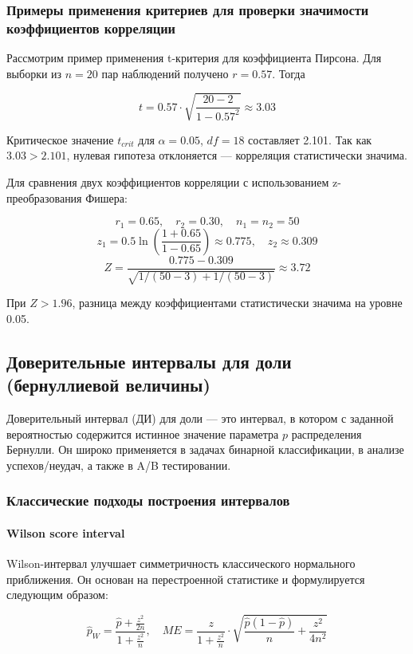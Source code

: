 \subsubsection{Примеры применения критериев для проверки значимости коэффициентов корреляции}

Рассмотрим пример применения t-критерия для коэффициента Пирсона. Для выборки из $n = 20$ пар наблюдений получено $r = 0.57$. Тогда

\[
t = 0.57 \cdot \sqrt{\frac{20 - 2}{1 - 0.57^2}} \approx 3.03
\]

Критическое значение $t_{crit}$ для $\alpha = 0.05$, $df = 18$ составляет 2.101. Так как $3.03 > 2.101$, нулевая гипотеза отклоняется — корреляция статистически значима.

Для сравнения двух коэффициентов корреляции с использованием z-преобразования Фишера:

\[
r_1 = 0.65, \quad r_2 = 0.30, \quad n_1 = n_2 = 50
\]
\[
z_1 = 0.5 \ln \left(\frac{1 + 0.65}{1 - 0.65}\right) \approx 0.775, \quad z_2 \approx 0.309
\]
\[
Z = \frac{0.775 - 0.309}{\sqrt{1/(50 - 3) + 1/(50 - 3)}} \approx 3.72
\]

При $Z > 1.96$, разница между коэффициентами статистически значима на уровне 0.05.

\subsection{Доверительные интервалы для доли (бернуллиевой величины)}

Доверительный интервал (ДИ) для доли — это интервал, в котором с заданной вероятностью содержится истинное значение параметра $p$ распределения Бернулли. Он широко применяется в задачах бинарной классификации, в анализе успехов/неудач, а также в A/B тестировании.

\subsubsection{Классические подходы построения интервалов}

\paragraph{Wilson score interval}

Wilson-интервал улучшает симметричность классического нормального приближения. Он основан на перестроенной статистике и формулируется следующим образом:

\[
\hat{p}_W = \frac{\hat{p} + \frac{z^2}{2n}}{1 + \frac{z^2}{n}}, \quad
ME = \frac{z}{1 + \frac{z^2}{n}} \cdot \sqrt{\frac{\hat{p}(1 - \hat{p})}{n} + \frac{z^2}{4n^2}}
\]


